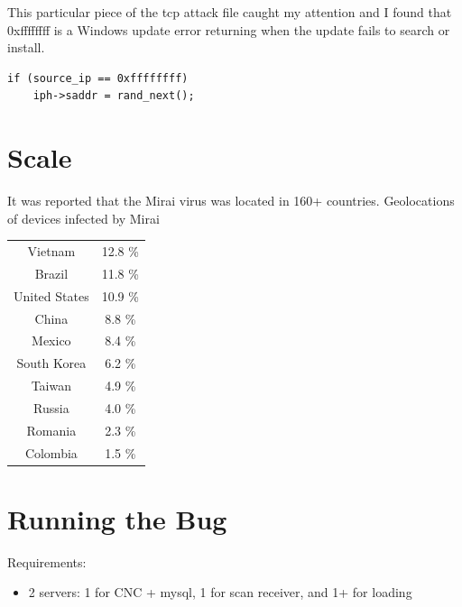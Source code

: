 \documentclass[12pt, letterpaper]{article}
\begin{document}
\begin{sloppypar}
\begin{flushleft}
\begin{verbatim}

\end{verbatim}

This particular piece of the tcp attack file caught my attention and I found
that 0xffffffff is a Windows update error returning when the update fails to search
or install. 
\begin{verbatim}
if (source_ip == 0xffffffff)
	iph->saddr = rand_next();
\end{verbatim}

\end{flushleft}


\section*{Scale}
\begin{flushleft}
It was reported that the Mirai virus was located in 160+ countries.
Geolocations of devices infected by Mirai

\begin{center}
\begin{tabular}{c c}
Vietnam	& 12.8 \%\\
Brazil & 11.8 \%\\
United States & 10.9 \%\\
China & 8.8 \%\\
Mexico & 8.4 \%\\
South Korea	& 6.2 \%\\
Taiwan & 4.9 \%\\
Russia & 4.0 \%\\
Romania	& 2.3 \%\\
Colombia	 & 1.5 \%\\
\end{tabular}
\end{center}

\end{flushleft}


\section*{Running the Bug}
\begin{flushleft}

Requirements: \\
\begin{itemize}
\item 2 servers: 1 for CNC + mysql, 1 for scan receiver, and 1+ for loading
\end{itemize}


\end{flushleft}
\end{sloppypar}
\end{document}
